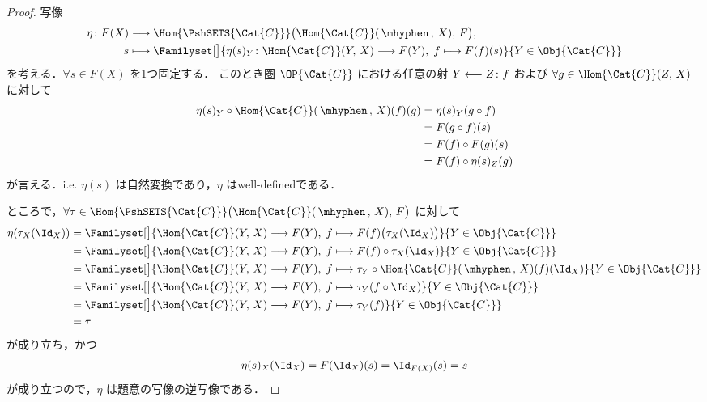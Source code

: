 \documentclass[TQFT_main]{subfiles}
\begin{document}
\begin{proof}
    写像
    \begin{align}
        \eta \colon F(X) &\lto \Hom{\PshSETS{\Cat{C}}}\bigl( \Hom{\Cat{C}}(\, \mhyphen\,,\, X),\, F \bigr), \\
        s &\lmto \Familyset[\big]{\eta(s)_Y \colon \Hom{\Cat{C}}(Y,\, X) \lto F(Y),\; f \lmto F(f)(s) }{Y \in \Obj{\Cat{C}}}
    \end{align}
    を考える．$\forall s \in F(X)$ を1つ固定する．
    このとき圏 $\OP{\Cat{C}}$ における任意の射 $Y \longleftarrow Z \colon f$ および $\forall g \in \Hom{\Cat{C}}(Z,\, X)$ に対して
    \begin{align}
        \eta(s)_Y \circ \Hom{\Cat{C}} (\, \mhyphen\, , \, X)(f) (g)
        &= \eta(s)_Y (g \circ f) \\
        &= F(g \circ f)(s) \\
        &= F(f) \circ F(g)(s) \\
        &= F(f) \circ \eta(s)_Z(g)
    \end{align}
    が言える．i.e. $\eta(s)$ は自然変換であり，$\eta$ はwell-definedである．
    
    ところで，$\forall \tau \in \Hom{\PshSETS{\Cat{C}}}\bigl( \Hom{\Cat{C}}(\, \mhyphen\,,\, X),\, F \bigr)$ に対して
    \begin{align}
        \eta (\tau_X(\Id_X))
        &= \Familyset[\big]{\Hom{\Cat{C}}(Y,\, X) \lto F(Y),\; f \lmto F(f)\bigl( \tau_X(\Id_X) \bigr)  }{Y \in \Obj{\Cat{C}}} \\
        &= \Familyset[\big]{\Hom{\Cat{C}}(Y,\, X) \lto F(Y),\; f \lmto F(f)\circ \tau_X(\Id_X)  }{Y \in \Obj{\Cat{C}}} \\
        &= \Familyset[\big]{\Hom{\Cat{C}}(Y,\, X) \lto F(Y),\; f \lmto \tau_Y \circ \Hom{\Cat{C}} (\,\mhyphen\,,\, X)(f)(\Id_X)  }{Y \in \Obj{\Cat{C}}} \\
        &= \Familyset[\big]{\Hom{\Cat{C}}(Y,\, X) \lto F(Y),\; f \lmto \tau_Y (f \circ \Id_X)  }{Y \in \Obj{\Cat{C}}} \\
        &= \Familyset[\big]{\Hom{\Cat{C}}(Y,\, X) \lto F(Y),\; f \lmto \tau_Y(f)  }{Y \in \Obj{\Cat{C}}} \\
        &= \tau
    \end{align}
    が成り立ち，かつ
    \begin{align}
        \eta(s)_X (\Id_X) = F(\Id_X) (s) = \Id_{F(X)}(s) = s
    \end{align}
    が成り立つので，$\eta$ は題意の写像の逆写像である．
\end{proof}
\end{document}
